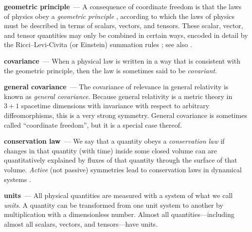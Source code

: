\documentclass{article}
\renewcommand{\paragraph}[1]{\par\textbf{#1}~---}
\begin{document}
\paragraph{geometric principle}
A consequence of coordinate freedom is that the laws of physics obey a \emph{geometric principle} \cite{mcp}, according to which the laws of physics must be described in terms of scalars, vectors, and tensors.
These scalar, vector, and tensor quantities may only be combined in certain ways, encoded in detail by the Ricci--Levi-Civita (or Einstein) summation rules \cite{ricci, einstein}; see also \cite{villar2021scalars}.

\paragraph{covariance}
When a physical law is written in a way that is consistent with the geometric principle, then the law is sometimes said to be \emph{covariant}.

\paragraph{general covariance}
The covariance of relevance in general relativity \cite{einstein} is known as \emph{general covariance}.
Because general relativity is a metric theory in $3+1$ spacetime dimensions with invariance with respect to arbitrary diffeomorphisms, this is a very strong symmetry.
General covariance is sometimes called ``coordinate freedom'', but it is a special case thereof.

\paragraph{conservation law}
We say that a quantity obeys a \emph{conservation law} if changes in that quantity (with time) inside some closed volume can are quantitatively explained by fluxes of that quantity through the surface of that volume.
\emph{Active} (not passive) symmetries lead to conservation laws in dynamical systems \cite{noether}.

\paragraph{units}
All physical quantities are measured with a system of what we call \emph{units}.
A quantity can be transformed from one unit system to another by multiplication with a dimensionless number.
Almost all quantities---including almost all scalars, vectors, and tensors---have units.
\end{document}
